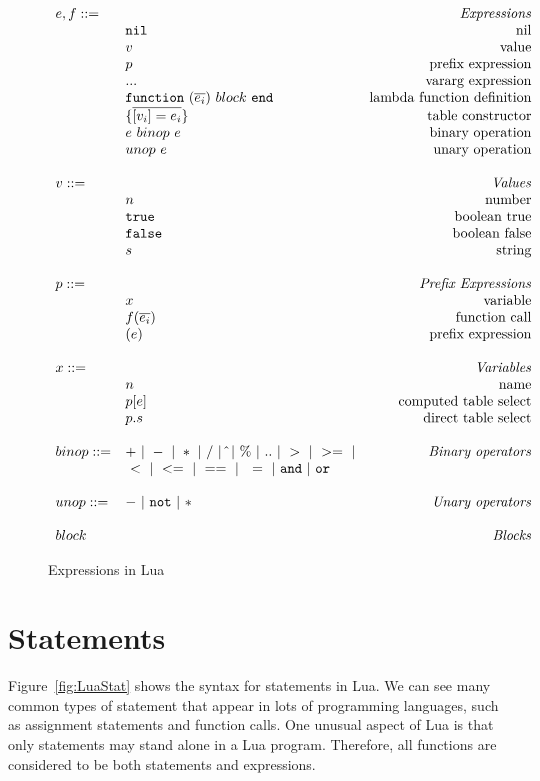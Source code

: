 \begin{figure}
\caption{Expressions in Lua}
\label{fig:LuaExp}
\[
\begin{array}{llr}
  \mydefhead{e,f ::=\qquad\qquad\qquad\qquad}{Expressions}
  \mydefcase{\tt nil}{nil}
  \mydefcase{v}{value}
  \mydefcase{p}{prefix expression}
  \mydefcase{\tt ...}{vararg expression}
  \mydefcase{\functiondef e {block}}{lambda function definition}
  \mydefcase{\{\overline{[v_i] = e_i}\}}{table constructor}
  \mydefcase{e ~binop~ e}{binary operation}
  \mydefcase{unop~ e}{unary operation}
  \\
  \mydefhead{v ::=\qquad\qquad\qquad\qquad}{Values}
  \mydefcase{n}{number}
  \mydefcase{\tt true}{boolean true}
  \mydefcase{\tt false}{boolean false}
  \mydefcase{s}{string}
  \\
  \mydefhead{p ::=\qquad\qquad\qquad\qquad}{Prefix Expressions}
  \mydefcase{x}{variable}
  \mydefcase{f(\overline{e_i})}{function call}
  \mydefcase{(e)}{prefix expression}
  
  \\
  \mydefhead{x ::=\qquad\qquad\qquad\qquad}{Variables}
  \mydefcase{n}{name}
  \mydefcase{p[e]}{computed table select}
  \mydefcase{p.s}{direct table select}
  \\
  binop ::= & + ~|~ - ~|~ * ~|~ / ~|~ \hat{} ~|~ \% ~|~ .. ~|~ > ~|~ >= ~|& \mbox{\emph{Binary operators}}\\
  \quad & ~ < ~|~ <= ~|~ == ~|~ ~= ~|~ {\tt and} ~|~ {\tt or} &  \\
  \\
  unop ::= & - ~|~ {\tt not} ~|~ *  & \mbox{\emph{Unary operators}} \\
  \\
  \mydefhead{block \qquad\qquad\qquad\qquad}{Blocks}
\end{array}
\]
\end{figure}



\section{Statements}
Figure~\ref{fig:LuaStat} shows the syntax for statements in Lua. We can see many common types of statement that appear in lots of programming languages, such as assignment statements and function calls.
One unusual aspect of Lua is that only statements may stand alone in a Lua program.
Therefore, all functions are considered to be both statements and expressions.

